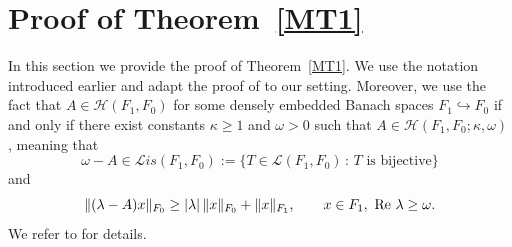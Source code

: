 \documentclass[reqno,11pt]{amsart}
\numberwithin{equation}{section}
\theoremstyle{remark}
\begin{document}
 
\section{Proof of Theorem~\ref{MT1}}\label{Sec:2}
 
In this section we provide the proof of  Theorem~\ref{MT1}.
We use the notation introduced earlier and adapt the proof of \cite[Theorem~2.1]{PSZ9a} to our setting.
Moreover, we use the fact that
 $A\in\mathcal{H}(F_1,F_0)$ for some densely embedded Banach spaces $F_1\hookrightarrow F_0$ if and only if there exist constants $\kappa\geq 1$ and $\omega>0$ such  that $A\in\mathcal{H}(F_1,F_0;\kappa,\omega)$, meaning that  
 \[
 \omega-A\in\mathcal{L}is(F_1,F_0):=\{T\in\mathcal{L}(F_1,F_0)\,:\, \text{$T$ is bijective}\}
 \]
 and
 \[
\|(\lambda-A)x\|_{F_0}\geq |\lambda|\, \|x\|_{F_0}+\|x\|_{F_1},\qquad x\in F_1,\ {\rm Re}\ \lambda\geq \omega.
 \]
We refer to \cite{LQPP} for details.

\medskip
\end{document}
